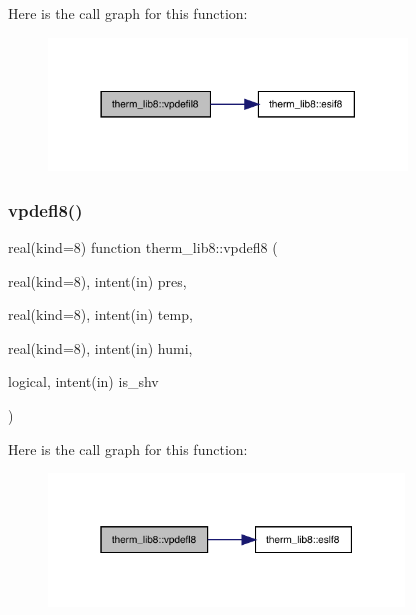 Here is the call graph for this function\+:
\nopagebreak
\begin{figure}[H]
\begin{center}
\leavevmode
\includegraphics[width=270pt]{namespacetherm__lib8_a11c93be5459d6b6a5501cbd52977e6ab_cgraph}
\end{center}
\end{figure}
\mbox{\label{namespacetherm__lib8_ab166c98ec9b055545b3545d1816fd9bc}} 
\subsubsection{\texorpdfstring{vpdefl8()}{vpdefl8()}}
{\footnotesize\ttfamily real(kind=8) function therm\+\_\+lib8\+::vpdefl8 (\begin{DoxyParamCaption}\item[{real(kind=8), intent(in)}]{pres,  }\item[{real(kind=8), intent(in)}]{temp,  }\item[{real(kind=8), intent(in)}]{humi,  }\item[{logical, intent(in)}]{is\+\_\+shv }\end{DoxyParamCaption})}

Here is the call graph for this function\+:
\nopagebreak
\begin{figure}[H]
\begin{center}
\leavevmode
\includegraphics[width=268pt]{namespacetherm__lib8_ab166c98ec9b055545b3545d1816fd9bc_cgraph}
\end{center}
\end{figure}


